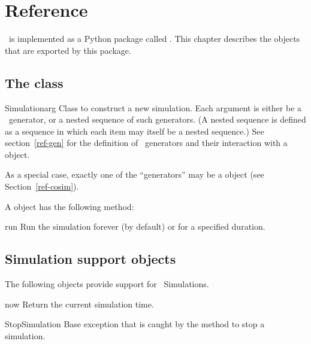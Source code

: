 \chapter{Reference \label{ref}}


\myhdl\ is implemented as a Python package called . This
chapter describes the objects that are exported by this package.

\section{The  class \label{ref-sim}}

\begin{classdesc}{Simulation}{arg }
Class to construct a new simulation. Each argument is either be a
\myhdl\ generator, or a nested sequence of such generators. (A nested
sequence is defined as a sequence in which each item may itself be a
nested sequence.) See section~\ref{ref-gen} for the
definition of \myhdl\ generators and their interaction with a
 object.

As a special case, exactly one of the ``generators'' may be
a  object (see Section~\ref{ref-cosim}).
\end{classdesc}

A  object has the following method:

\begin{methoddesc}[Simulation]{run}{}
Run the simulation forever (by default) or for a specified duration.
\end{methoddesc}


\section{Simulation support objects \label{ref-simsupport}}

The following objects provide support for \myhdl\ Simulations.

\begin{funcdesc}{now}{}
Return the current simulation time.
\end{funcdesc}

\begin{excclassdesc}{StopSimulation}{}
Base exception that is caught by the  method to
stop a simulation.
\end{excclassdesc}

